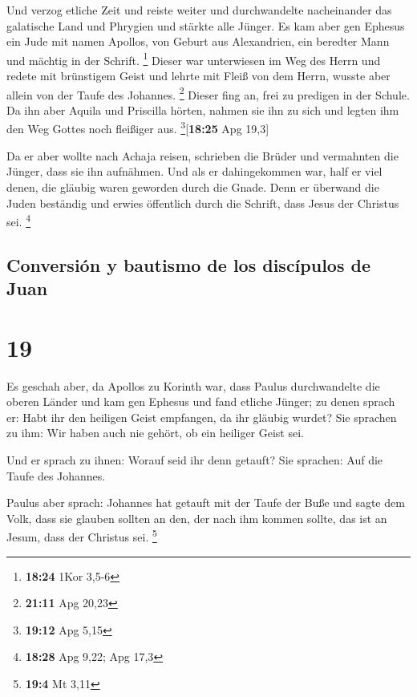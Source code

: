  Und verzog etliche Zeit und reiste weiter und
durchwandelte nacheinander das galatische Land und Phrygien und stärkte
alle Jünger.  Es kam aber gen Ephesus ein Jude mit namen
Apollos, von Geburt aus Alexandrien, ein beredter Mann und mächtig in
der Schrift. \footnote{\textbf{18:24} 1Kor 3,5-6}  Dieser
war unterwiesen im Weg des Herrn und redete mit brünstigem Geist und
lehrte mit Fleiß von dem Herrn, wusste aber allein von der Taufe des
Johannes. \footnote{\textbf{21:11} Apg 20,23}  Dieser
fing an, frei zu predigen in der Schule. Da ihn aber Aquila und
Priscilla hörten, nahmen sie ihn zu sich und legten ihm den Weg Gottes
noch fleißiger aus. \footnote{\textbf{19:12} Apg 5,15}{[}\textbf{18:25}
Apg 19,3{]}

 Da er aber wollte nach Achaja reisen, schrieben die
Brüder und vermahnten die Jünger, dass sie ihn aufnähmen. Und als er
dahingekommen war, half er viel denen, die gläubig waren geworden durch
die Gnade.  Denn er überwand die Juden beständig und
erwies öffentlich durch die Schrift, dass Jesus der Christus sei.
\footnote{\textbf{18:28} Apg 9,22; Apg 17,3}

\hypertarget{conversiuxf3n-y-bautismo-de-los-discuxedpulos-de-juan}{%
\subsection{Conversión y bautismo de los discípulos de
Juan}\label{conversiuxf3n-y-bautismo-de-los-discuxedpulos-de-juan}}

\hypertarget{section-18}{%
\section{19}\label{section-18}}

 Es geschah aber, da Apollos zu Korinth war, dass Paulus
durchwandelte die oberen Länder und kam gen Ephesus und fand etliche
Jünger;  zu denen sprach er: Habt ihr den heiligen Geist
empfangen, da ihr gläubig wurdet? Sie sprachen zu ihm: Wir haben auch
nie gehört, ob ein heiliger Geist sei.

 Und er sprach zu ihnen: Worauf seid ihr denn getauft? Sie
sprachen: Auf die Taufe des Johannes.

 Paulus aber sprach: Johannes hat getauft mit der Taufe
der Buße und sagte dem Volk, dass sie glauben sollten an den, der nach
ihm kommen sollte, das ist an Jesum, dass der Christus sei. \footnote{\textbf{19:4}
  Mt 3,11}

